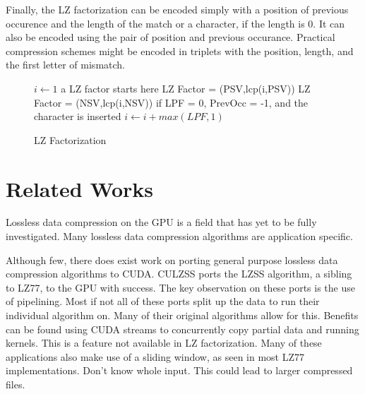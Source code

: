 Finally, the LZ factorization can be encoded simply with a position of previous occurence and the length of the match or a character, if the length is 0.
It can also be encoded using the pair of position and previous occurance.
Practical compression schemes might be encoded in triplets with the position, length, and the first letter of mismatch.

\begin{figure}
\begin{algorithmic}[1]
\State $i \gets 1$
\State a LZ factor starts here
\State LZ Factor = (PSV,lcp(i,PSV))
\Else
\State LZ Factor = (NSV,lcp(i,NSV))
\EndIf
\State if LPF = 0, PrevOcc = -1, and the character is inserted
\State $i \gets i + max(LPF,1)$\EndWhile
\EndProcedure
\end{algorithmic}
\caption{LZ Factorization}\label{euclid}
\end{figure}

\section{Related Works}

Lossless data compression on the GPU is a field that has yet to be fully investigated.
Many lossless data compression algorithms are application specific.

Although few, there does exist work on porting general purpose lossless data compression algorithms to CUDA.
CULZSS ports the LZSS algorithm, a sibling to LZ77, to the GPU with success.
The key observation on these ports is the use of pipelining.
Most if not all of these ports split up the data to run their individual algorithm on.
Many of their original algorithms allow for this.
Benefits can be found using CUDA streams to concurrently copy partial data and running kernels.
This is a feature not available in LZ factorization.
Many of these applications also make use of a sliding window, as seen in most LZ77 implementations.
Don't know whole input.
This could lead to larger compressed files.

